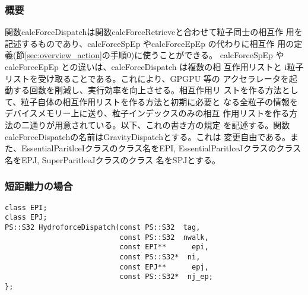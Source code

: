 
\subsubsection{概要}

関数calcForceDispatchは関数calcForceRetrieveと合わせて粒子同士の相互作
用を記述するものであり、calcForceSpEp やcalcForceEpEp の代わりに相互作
用の定義(節\ref{sec:overview_action}の手順0)に使うことができる。
calcForceSpEp やcalcForceEpEp との違いは、calcForceDispatch は複数の相
互作用リストと i粒子リストを受け取ることである。これにより、GPGPU 等の
アクセラレータを起動する回数を削減し、実行効率を向上させる。相互作用リ
ストを作る方法として、粒子自体の相互作用リストを作る方法と初期に必要と
なる全粒子の情報をデバイスメモリー上に送り、粒子インデックスのみの相互
作用リストを作る方法の二通りが用意されている。以下、これの書き方の規定
を記述する。関数calcForceDispatchの名前はGravityDispatchとする。これは
変更自由である。また、EssentialParitlceIクラスのクラス名をEPI,
EssentialParitlceJクラスのクラス名をEPJ, SuperParitlceJクラスのクラス
名をSPJとする。

\subsubsection{短距離力の場合}
\begin{lstlisting}[caption=calcForceDispatch]
class EPI;
class EPJ;
PS::S32 HydroforceDispatch(const PS::S32  tag,
                           const PS::S32  nwalk,
                           const EPI**      epi,
                           const PS::S32*  ni,
                           const EPJ**      epj,
                           const PS::S32*  nj_ep;
};
\end{lstlisting}

